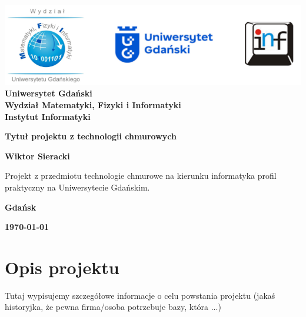 \documentclass[12pt,a4paper]{article}
\newcommand{\hmwkTitle}{Tytuł projektu z technologii chmurowych} %
\newcommand{\hmwkDueDate}{\today} %
\newcommand{\hmwkAuthorName}{Wiktor Sieracki} %
\begin{document}
\begin{titlepage}
    \vfill
	\begin{center}
	\hspace*{-1cm}
	\vspace*{0.5cm}
    \includegraphics[scale=0.55]{imagens/loga.png}\\
	\textbf{Uniwersytet Gdański \\ [0.05cm]Wydział Matematyki, Fizyki i Informatyki \\ [0.05cm] Instytut Informatyki}

	\vspace{0.6cm}
	\vspace{4cm}
	{\huge \textbf{\hmwkTitle}}\vspace{8mm}
	
	{\large \textbf{\hmwkAuthorName}}\\[3cm]
	
		\hspace{.45\textwidth} %
	   \begin{minipage}{.5\textwidth}
	   Projekt z przedmiotu technologie chmurowe na kierunku informatyka profil praktyczny na Uniwersytecie Gdańskim.\\[0.1cm]
	  \end{minipage}
	  \vfill
	
	\textbf{Gdańsk}
	
	\textbf{\hmwkDueDate}
	\end{center}
	
\end{titlepage}

\newpage
\setcounter{secnumdepth}{5}
\tableofcontents
\newpage

\section{Opis projektu}
\label{sec:Project}

Tutaj wypisujemy szczegółowe informacje o celu powstania projektu (jakaś historyjka, że pewna firma/osoba potrzebuje bazy, która ...)
\end{document}
